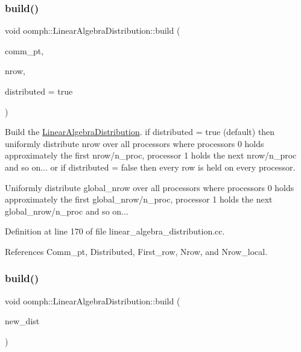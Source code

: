 \subsubsection{\texorpdfstring{build()}{build()}\hspace{0.1cm}{\footnotesize\ttfamily [2/4]}}
{\footnotesize\ttfamily void oomph\+::\+Linear\+Algebra\+Distribution\+::build (\begin{DoxyParamCaption}\item[{const \hyperlink{classoomph_1_1OomphCommunicator}{Oomph\+Communicator} $\ast$const}]{comm\+\_\+pt,  }\item[{const unsigned \&}]{nrow,  }\item[{const bool \&}]{distributed = {\ttfamily true} }\end{DoxyParamCaption})}



Build the \hyperlink{classoomph_1_1LinearAlgebraDistribution}{Linear\+Algebra\+Distribution}. if distributed = true (default) then uniformly distribute nrow over all processors where processors 0 holds approximately the first nrow/n\+\_\+proc, processor 1 holds the next nrow/n\+\_\+proc and so on... or if distributed = false then every row is held on every processor. 

Uniformly distribute global\+\_\+nrow over all processors where processors 0 holds approximately the first global\+\_\+nrow/n\+\_\+proc, processor 1 holds the next global\+\_\+nrow/n\+\_\+proc and so on... 

Definition at line 170 of file linear\+\_\+algebra\+\_\+distribution.\+cc.



References Comm\+\_\+pt, Distributed, First\+\_\+row, Nrow, and Nrow\+\_\+local.

\mbox{\label{classoomph_1_1LinearAlgebraDistribution_a49b331da406e8a5b5af87f4177ddd41e}} 
\subsubsection{\texorpdfstring{build()}{build()}\hspace{0.1cm}{\footnotesize\ttfamily [3/4]}}
{\footnotesize\ttfamily void oomph\+::\+Linear\+Algebra\+Distribution\+::build (\begin{DoxyParamCaption}\item[{const \hyperlink{classoomph_1_1LinearAlgebraDistribution}{Linear\+Algebra\+Distribution} \&}]{new\+\_\+dist }\end{DoxyParamCaption})}



